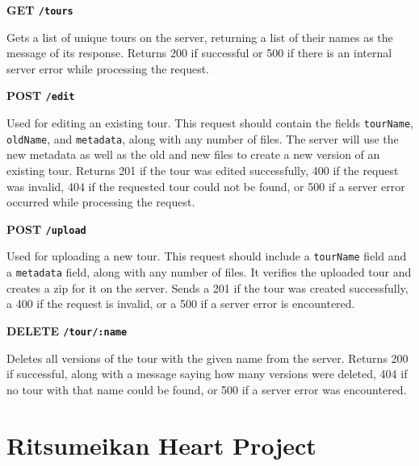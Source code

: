 \documentclass[a4paper, 10pt, american, titlepage]{article}
\newenvironment{indented}[1]%
{\begin{list}{}%
	{\setlength{\leftmargin}{#1}}%
	\item[]%
}
{\end{list}}
\begin{document}
\noindent\textbf{GET \texttt{/tours}}

\begin{indented}{1cm}
	Gets a list of unique tours on the server, returning a list of their names
	as the message of its response. Returns 200 if successful or 500 if there is
	an internal server error while processing the request.
\end{indented}

\noindent\textbf{POST \texttt{/edit}}

\begin{indented}{1cm}
	Used for editing an existing tour. This request should contain the fields
	\texttt{tourName}, \texttt{oldName}, and \texttt{metadata}, along with any
	number of files.  The server will use the new metadata as well as the old
	and new files to create a new version of an existing tour. Returns 201 if
	the tour was edited successfully, 400 if the request was invalid, 404 if the
	requested tour could not be found, or 500 if a server error occurred while
	processing the request.
\end{indented}

\noindent\textbf{POST \texttt{/upload}}

\begin{indented}{1cm}
	Used for uploading a new tour. This request should include a
	\texttt{tourName} field and a \texttt{metadata} field, along with any number
	of files. It verifies the uploaded tour and creates a zip for it on the
	server. Sends a 201 if the tour was created successfully, a 400 if the
	request is invalid, or a 500 if a server error is encountered.
\end{indented}

\noindent\textbf{DELETE \texttt{/tour/:name}}

\begin{indented}{1cm}
	Deletes all versions of the tour with the given name from the server.
	Returns 200 if successful, along with a message saying how many versions
	were deleted, 404 if no tour with that name could be found, or 500 if a
	server error was encountered.
\end{indented}

\clearpage

\section{Ritsumeikan Heart Project}
\label{sec:ritsumeikanHeartProject}
\end{document}
